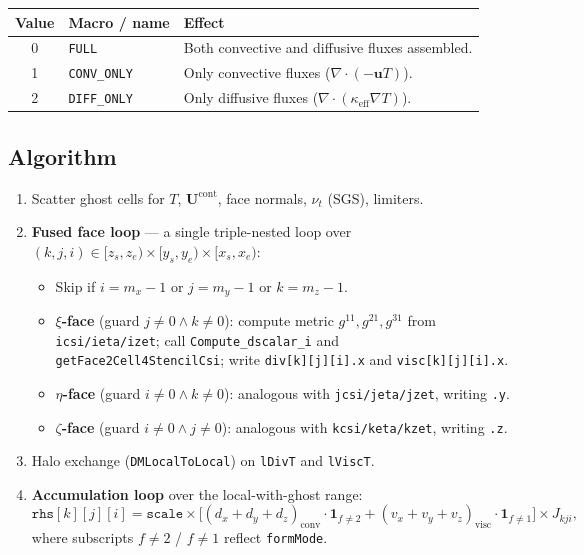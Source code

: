 \documentclass[12pt,a4paper]{article}
\begin{document}
\begin{center}
\begin{tabular}{clp{8cm}}
\toprule
\textbf{Value} & \textbf{Macro / name} & \textbf{Effect} \\
\midrule
0 & \texttt{FULL} & Both convective and diffusive fluxes assembled. \\
1 & \texttt{CONV\_ONLY} & Only convective fluxes ($\nabla\!\cdot\!(-\mathbf{u}T)$). \\
2 & \texttt{DIFF\_ONLY} & Only diffusive fluxes ($\nabla\!\cdot\!(\kappa_{\text{eff}}\nabla T)$). \\
\bottomrule
\end{tabular}
\end{center}

\subsection*{Algorithm}

\begin{enumerate}
  \item Scatter ghost cells for $T$, $\mathbf{U}^{\text{cont}}$, face normals,
        $\nu_t$ (SGS), limiters.
  \item \textbf{Fused face loop} — a single triple-nested loop over
        $(k,j,i)\in[z_s,z_e)\times[y_s,y_e)\times[x_s,x_e)$:
        \begin{itemize}
          \item Skip if $i{=}m_x{-}1$ or $j{=}m_y{-}1$ or $k{=}m_z{-}1$.
          \item \textbf{$\xi$-face} (guard $j\neq 0 \land k\neq 0$):
                compute metric $g^{11},g^{21},g^{31}$ from \texttt{icsi/ieta/izet};
                call \texttt{Compute\_dscalar\_i} and
                \texttt{getFace2Cell4StencilCsi};
                write \texttt{div[k][j][i].x} and \texttt{visc[k][j][i].x}.
          \item \textbf{$\eta$-face} (guard $i\neq 0 \land k\neq 0$):
                analogous with \texttt{jcsi/jeta/jzet}, writing \texttt{.y}.
          \item \textbf{$\zeta$-face} (guard $i\neq 0 \land j\neq 0$):
                analogous with \texttt{kcsi/keta/kzet}, writing \texttt{.z}.
        \end{itemize}
  \item Halo exchange (\texttt{DMLocalToLocal}) on \texttt{lDivT} and \texttt{lViscT}.
  \item \textbf{Accumulation loop} over the local-with-ghost range:
        \[
          \texttt{rhs}[k][j][i]
          = \texttt{scale}\times
            \bigl[
              (d_x + d_y + d_z)_{\text{conv}}\cdot\mathbf{1}_{f\neq 2}
            + (v_x + v_y + v_z)_{\text{visc}}\cdot\mathbf{1}_{f\neq 1}
            \bigr]
            \times J_{kji},
        \]
        where subscripts $f\neq 2$ / $f\neq 1$ reflect \texttt{formMode}.
\end{enumerate}
\end{document}
